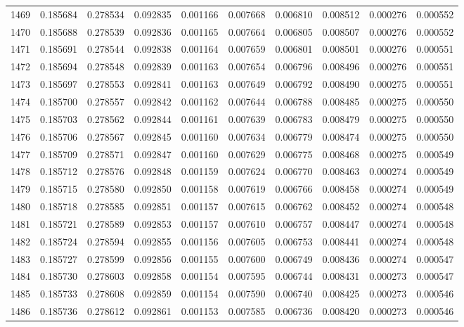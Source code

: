 \begin{tabular}{lrrrrrrrrr}
1469 & 0.185684 & 0.278534 & 0.092835 & 0.001166 & 0.007668 & 0.006810 & 0.008512 & 0.000276 & 0.000552 \\
1470 & 0.185688 & 0.278539 & 0.092836 & 0.001165 & 0.007664 & 0.006805 & 0.008507 & 0.000276 & 0.000552 \\
1471 & 0.185691 & 0.278544 & 0.092838 & 0.001164 & 0.007659 & 0.006801 & 0.008501 & 0.000276 & 0.000551 \\
1472 & 0.185694 & 0.278548 & 0.092839 & 0.001163 & 0.007654 & 0.006796 & 0.008496 & 0.000276 & 0.000551 \\
1473 & 0.185697 & 0.278553 & 0.092841 & 0.001163 & 0.007649 & 0.006792 & 0.008490 & 0.000275 & 0.000551 \\
1474 & 0.185700 & 0.278557 & 0.092842 & 0.001162 & 0.007644 & 0.006788 & 0.008485 & 0.000275 & 0.000550 \\
1475 & 0.185703 & 0.278562 & 0.092844 & 0.001161 & 0.007639 & 0.006783 & 0.008479 & 0.000275 & 0.000550 \\
1476 & 0.185706 & 0.278567 & 0.092845 & 0.001160 & 0.007634 & 0.006779 & 0.008474 & 0.000275 & 0.000550 \\
1477 & 0.185709 & 0.278571 & 0.092847 & 0.001160 & 0.007629 & 0.006775 & 0.008468 & 0.000275 & 0.000549 \\
1478 & 0.185712 & 0.278576 & 0.092848 & 0.001159 & 0.007624 & 0.006770 & 0.008463 & 0.000274 & 0.000549 \\
1479 & 0.185715 & 0.278580 & 0.092850 & 0.001158 & 0.007619 & 0.006766 & 0.008458 & 0.000274 & 0.000549 \\
1480 & 0.185718 & 0.278585 & 0.092851 & 0.001157 & 0.007615 & 0.006762 & 0.008452 & 0.000274 & 0.000548 \\
1481 & 0.185721 & 0.278589 & 0.092853 & 0.001157 & 0.007610 & 0.006757 & 0.008447 & 0.000274 & 0.000548 \\
1482 & 0.185724 & 0.278594 & 0.092855 & 0.001156 & 0.007605 & 0.006753 & 0.008441 & 0.000274 & 0.000548 \\
1483 & 0.185727 & 0.278599 & 0.092856 & 0.001155 & 0.007600 & 0.006749 & 0.008436 & 0.000274 & 0.000547 \\
1484 & 0.185730 & 0.278603 & 0.092858 & 0.001154 & 0.007595 & 0.006744 & 0.008431 & 0.000273 & 0.000547 \\
1485 & 0.185733 & 0.278608 & 0.092859 & 0.001154 & 0.007590 & 0.006740 & 0.008425 & 0.000273 & 0.000546 \\
1486 & 0.185736 & 0.278612 & 0.092861 & 0.001153 & 0.007585 & 0.006736 & 0.008420 & 0.000273 & 0.000546 \\

\end{tabular}
